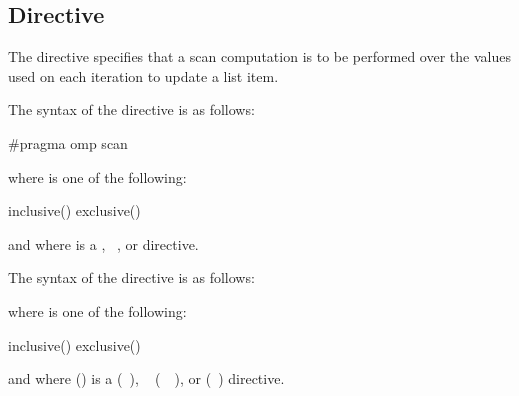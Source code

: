 \subsection{ Directive}
\label{subsec:scan Directive}

\summary
The  directive specifies that a scan computation is to be performed over the
values used on each iteration to update a list item.

\syntax
\begin{ccppspecific}
The syntax of the  directive is as follows:

\begin{ompcPragma}
{
   #pragma omp scan  
}
\end{ompcPragma}

where  is one of the following:
\begin{indentedcodelist}
inclusive()
exclusive()
\end{indentedcodelist}

and where  is a , ~, or
 directive.

\end{ccppspecific}

\begin{fortranspecific}
The syntax of the  directive is as follows:


where  is one of the following:
\begin{indentedcodelist}
inclusive()
exclusive()
\end{indentedcodelist}

and where  () is a 
(~), ~
(~~), or
 (~) directive.

\end{fortranspecific}

